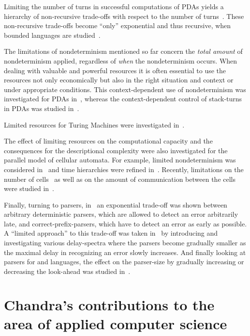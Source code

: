 \documentclass[copyright]{eptcs}
\begin{document}
Limiting the number of turns in successful computations of PDAs yields a hierarchy of non-recursive trade-offs with respect to the
number of turns~\cite{Malcher07}. These non-recursive trade-offs become ``only'' exponential and thus recursive, when bounded languages
are studied~\cite{MalcherP07}.

The limitations of nondeterminism mentioned so far concern the \emph{total amount} of nondeterminism applied, 
regardless of \emph{when} the nondeterminism occurs. When dealing with valuable and powerful resources it is often 
essential to use the resources not only economically but also in the
right situation and context or under appropriate conditions. This context-dependent use of nondeterminism was 
investigated for PDAs in~\cite{KutribM07a,KutribMW09,Masopust09},
whereas the context-dependent control of stack-turns in PDAs was studied in~\cite{KutribM07}. 

Limited resources for Turing Machines were investigated in~\cite{CaiC97,GoldsmithLM96,KleinK02,Kutrib02,Kutrib03}.

The effect of limiting resources on the computational capacity and the consequences for the descriptional complexity were also investigated
for the parallel model of cellular automata. For example, limited nondeterminism was considered in~\cite{BuchholzKK98,BuchholzKK02,BuchholzKK03}
and time hierarchies were refined in~\cite{BuchholzKK00,IwamotoHMI02}. Recently, limitations on the
number of cells~\cite{Malcher05,MalcherMP08} as well as on the amount of communication between the cells were studied in~\cite{KutribM09,KutribM09a}.

Finally, turning to parsers, in~\cite{GellerHSU77} an exponential trade-off was shown between arbitrary deterministic parsers, which are allowed to detect
an error arbitrarily late, and correct-prefix-parsers, which have to detect an error as early as possible. A ``limited approach'' to this trade-off 
was taken in~\cite{Fuessel92} by introducing and investigating various delay-spectra where the parsers become gradually smaller as the maximal delay 
in recognizing an error slowly increases. And finally looking at parsers for  and  languages, the effect on the 
parser-size by gradually increasing or decreasing the look-ahead was studied in~\cite{BertschN01,Blum01,LeungW00}.

\section{Chandra's contributions to the area of applied computer science}\label{s:practical}
\end{document}
